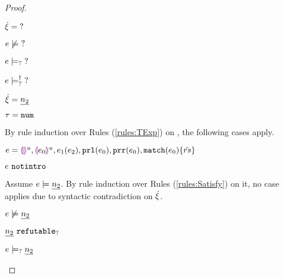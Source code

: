 \begin{proof}
\begin{byCases}
\item[\text{(\ref{rule:CTUnknown})}]
    \begin{pfsteps*}
    \item $\dot{\xi}=\mathtt{?}$ 
    \item $e \not\models \mathtt{?}$ 
    \item $e \models_{?} \mathtt{?}$  
    \item $e \models_{?}^{\dag} \mathtt{?}$  
    \end{pfsteps*}
    
\item[\text{(\ref{rule:CTNum})}]
    \begin{pfsteps*}
    \item $\dot{\xi}=\underline{n_2}$ 
    \item $\tau=\mathtt{num}$ 
    \end{pfsteps*}
    By rule induction over Rules (\ref{rules:TExp}) on , the following cases apply.
    \begin{byCases}
    \item[\text{(\ref{rule:TEHole}),(\ref{rule:THole}),(\ref{rule:TAp}),(\ref{rule:TPrl}),(\ref{rule:TPrr}),(\ref{rule:TMatchZPre}),(\ref{rule:TMatchNZPre})}]
        \begin{pfsteps*}
        \item $e=\textcolor{violet}{\llparenthesis}\textcolor{violet}{\rrparenthesis}^{u},\textcolor{violet}{\llparenthesis} e_0\textcolor{violet}{\rrparenthesis}^{u},e_1(e_2),\mathtt{prl}(e_0),\mathtt{prr}(e_0),\mathtt{match}(e_0) \{\hat{rs}\}$ 
        \item $e ~\mathtt{notintro}$  
        \end{pfsteps*}
        Assume $e \models \underline{n_2}$. By rule induction over Rules (\ref{rules:Satisfy}) on it, no case applies due to syntactic contradiction on $\dot{\xi}$.\\
        \begin{pfsteps*}
        \item $e \not\models \underline{n_2}$ 
        \item $\underline{n_2} ~\mathtt{refutable}_?$  
        \item $e \models_{?} \underline{n_2}$  

\end{pfsteps*}
\end{byCases}
\end{byCases}
\end{proof}
